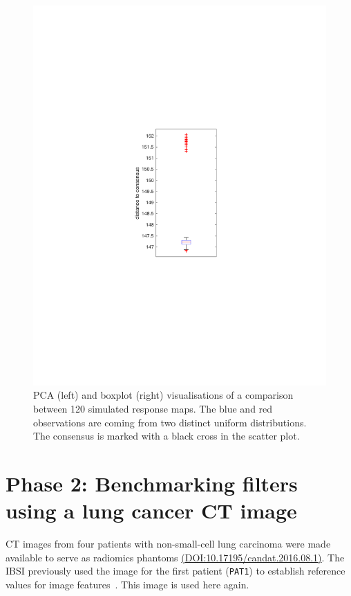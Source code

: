 \documentclass[fleqn,a4paper,oneside,openany]{book}
\begin{document}
\begin{figure}[h!]
\includegraphics[trim = 0 -30 0 0, clip, scale=.7]{BoxplotConsensus.pdf}
\caption{PCA (left) and boxplot (right) visualisations of a comparison between 120 simulated response maps. The blue and red observations are coming from two distinct uniform distributions. The consensus is marked with a black cross in the scatter plot.}
\label{fig:responseMapComparison}
\end{figure}
%
\section{Phase 2: Benchmarking filters using a lung cancer CT image}\label{sec:featureBenchmarkLungCT}
%
CT images from four patients with non-small-cell lung carcinoma were made available to serve as radiomics phantoms \href{http://dx.doi.org/10.17195/candat.2016.08.1}{(DOI:10.17195/candat.2016.08.1)}. The IBSI previously used the image for the first patient (\texttt{PAT1}) to establish reference values for image features~\cite{ZLV2017}. This image is used here again.
\end{document}

